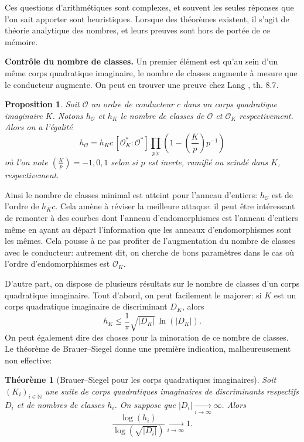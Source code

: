 \documentclass[11pt,a4paper]{article}
\newcommand{\N}{\mathbb{N}}
\renewcommand{\O}{\mathcal{O}}
\newcommand{\vers}{\longrightarrow}
\renewcommand{\v}{\vspace{5mm}}
\newtheorem*{thm}{Théorème}
\newtheorem*{prop}{Proposition}
\theoremstyle{definition}
\begin{document}
Ces questions d'arithmétiques sont complexes, et souvent les seules réponses que l'on sait apporter sont heuristiques. Lorsque des théorèmes existent, il s'agit de théorie analytique des nombres, et leurs preuves sont hors de portée de ce mémoire.
\v

\textbf{Contrôle du nombre de classes.} Un premier élément est qu'au sein d'un même corps quadratique imaginaire, le nombre de classes augmente à mesure que le conducteur augmente. On peut en trouver une preuve chez Lang \cite{Lang}, th. 8.7.

\begin{prop}
Soit $\O$ un ordre de conducteur $c$ dans un corps quadratique imaginaire $K$. Notons $h_\O$ et $h_K$ le nombre de classes de $\O$ et $\O_K$ respectivement. Alors on a l'égalité
$$h_\O = h_K c\, [\O_K^*:\O^*] \prod_{p|c} \left(1 - \left(\frac{K}{p}\right)p^{-1}\right)$$
où l'on note $\left(\frac{K}{p}\right) = -1, 0, 1$ selon si $p$ est inerte, ramifié ou scindé dans $K$, respectivement.
\end{prop}

Ainsi le nombre de classes minimal est atteint pour l'anneau d'entiers: $h_\O$ est de l'ordre de $h_K c$. Cela amène à réviser la \og meilleure attaque\fg: il peut être intéressant de remonter à des courbes dont l'anneau d'endomorphismes est l'anneau d'entiers même en ayant au départ l'information que les anneaux d'endomorphismes sont les mêmes. Cela pousse à ne pas profiter de l'augmentation du nombre de classes avec le conducteur: autrement dit, on cherche de bons paramètres dans le cas où l'ordre d'endomorphismes est $\O_K$.

D'autre part, on dispose de plusieurs résultats sur le nombre de classes d'un corps quadratique imaginaire. Tout d'abord, on peut facilement le majorer: si $K$ est un corps quadratique imaginaire de discriminant $D_K$, alors
$$h_K \leq \frac{1}{\pi} \sqrt{|D_K|}\, \ln(|D_K|).$$
On peut également dire des choses pour la minoration de ce nombre de classes. Le théorème de Brauer--Siegel donne une première indication, malheureusement non effective:
\begin{thm}[Brauer--Siegel pour les corps quadratiques imaginaires]
Soit $(K_i)_{i\in \N}$ une suite de corps quadratiques imaginaires de discriminants respectifs $D_i$ et de nombres de classes $h_i$. On suppose que
$|D_i| \underset{i\to\infty}{\vers} \infty.$
Alors
$$\frac{\log(h_i)}{\log(\sqrt{|D_i|})} \underset{i\to\infty}{\vers} 1.$$
\end{thm}
\end{document}
